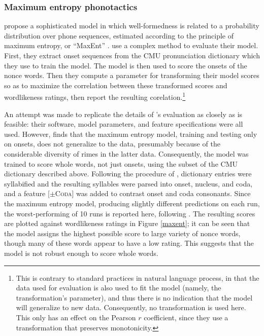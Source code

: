 \subsubsection{Maximum entropy phonotactics}

\citet{Hayes2008a} propose a sophisticated model in which well-formedness is related to a probability distribution over phone sequences, estimated according to the principle of maximum entropy, or ``MaxEnt'' \citep[e.g.,][]{Goldwater2003,Jager2007}. \citeauthor{Hayes2008a} use a complex method to evaluate their model. First, they extract onset sequences from the CMU pronunciation dictionary which they use to train the model. The model is then used to score the onsets of the \citet{Scholes1966} nonce words. Then they compute a parameter for transforming their model scores so as to maximize the correlation between these transformed scores and wordlikeness ratings, then report the resulting corelation.\footnote{This is contrary to standard practices in natural language process, in that the data used for evaluation is also used to fit the model (namely, the transformation's parameter), and thus there is no indication that the model will generalize to new data. Consequently, no transformation is used here. This only has an effect on the Pearson $r$ coefficient, since they use a transformation that preserves monotonicity.}

An attempt was made to replicate the details of \citeauthor{Hayes2008a}'s evaluation as closely as is feasible: their software, model parameters, and feature specifications were all used. However, \citet{Albright2009a} finds that the maximum entropy model, training and testing only on onsets, does not generalize to the \citet{Albright2003b} data, presumably because of the considerable diversity of rimes in the latter data. Consequently, the model was trained to score whole words, not just onsets, using the subset of the CMU dictionary described above. Following the procedure of \citet{HayesInPress}, dictionary entries were syllabified and the resulting syllables were parsed into onset, nucleus, and coda, and a feature [$\pm$\textsc{Coda}] was added to contrast onset and coda consonants. Since the maximum entropy model, producing slightly different predictions on each run, the worst-performing of 10 runs is reported here, following \citet{Hayes2008a}. The resulting scores are plotted against wordlikeness ratings in Figure \ref{maxent}; it can be seen that the model assigns the highest possible score to large variety of nonce words, though many of these words appear to have a low rating. This suggests that the model is not robust enough to score whole words.

